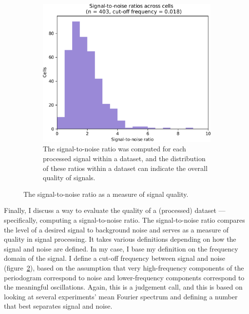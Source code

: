 \begin{figure}
\begin{subfigure}[htpb]{0.5\textwidth}
   \includegraphics[width=\textwidth]{pyruvate_snr_edit}
   \caption{
     The signal-to-noise ratio was computed for each processed signal within a dataset, and the distribution of these ratios within a dataset can indicate the overall quality of signals.
   }
   \label{fig:analysis-snr-histogram-example}
  \end{subfigure}
  \caption{
    The signal-to-noise ratio as a measure of signal quality.
  }
  \label{fig:analysis-snr}
\end{figure}

Finally, I discuss a way to evaluate the quality of a (processed) dataset --- specifically, computing a signal-to-noise ratio.
The signal-to-noise ratio compares the level of a desired signal to background noise and serves as a measure of quality in signal processing.
It takes various definitions depending on how the signal and noise are defined.
In my case, I base my definition on the frequency domain of the signal.
I define a cut-off frequency between signal and noise (figure~\ref{fig:analysis-snr}), based on the assumption that very high-frequency components of the periodogram correspond to noise and lower-frequency components correspond to the meaningful oscillations.%
Again, this is a judgement call, and this is based on looking at several experiments' mean Fourier spectrum and defining a number that best separates signal and noise.


